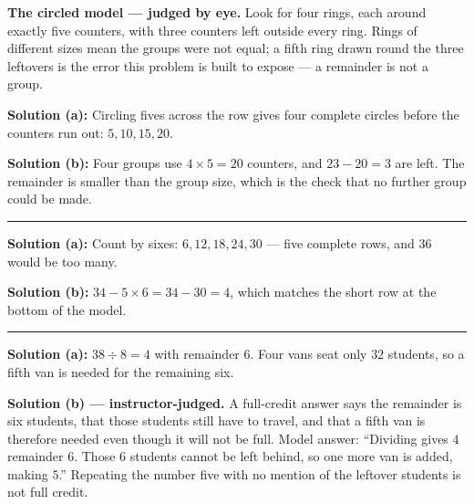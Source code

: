 \documentclass[12pt]{article}
\begin{document}



\textbf{The circled model --- judged by eye.} Look for four rings, each around exactly five counters,
with three counters left outside every ring. Rings of different sizes mean the groups were not equal;
a fifth ring drawn round the three leftovers is the error this problem is built to expose --- a
remainder is not a group.

\textbf{Solution (a):} Circling fives across the row gives four complete circles before the counters
run out: $5, 10, 15, 20$. 

\textbf{Solution (b):} Four groups use $4 \times 5 = 20$ counters, and $23 - 20 = 3$ are left. The
remainder is smaller than the group size, which is the check that no further group could be made.

\vspace{0.12cm}\noindent\rule{\linewidth}{0.2pt}


\textbf{Solution (a):} Count by sixes: $6, 12, 18, 24, 30$ --- five complete rows, and $36$ would be
too many. 

\textbf{Solution (b):} $34 - 5 \times 6 = 34 - 30 = 4$, which matches the short row at the bottom of
the model. 

\vspace{0.12cm}\noindent\rule{\linewidth}{0.2pt}


\textbf{Solution (a):} $38 \div 8 = 4$ with remainder $6$. Four vans seat only $32$ students, so a
fifth van is needed for the remaining six. 

\textbf{Solution (b) --- instructor-judged.} A full-credit answer says the remainder is six students,
that those students still have to travel, and that a fifth van is therefore needed even though it
will not be full. Model answer: ``Dividing gives $4$ remainder $6$. Those $6$ students cannot be left
behind, so one more van is added, making $5$.'' Repeating the number five with no mention of the
leftover students is not full credit.
\end{document}
